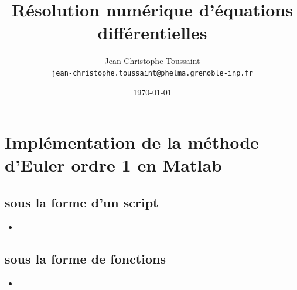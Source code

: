 \documentclass[a4paper, 10pt]{article}
\newcommand{\insertlisting}[2]
  {\begin{itemize}\item[]\end{itemize}}
\begin{document}
\title{Résolution numérique d'équations différentielles}

\author{Jean-Christophe Toussaint\\
 \texttt{jean-christophe.toussaint@phelma.grenoble-inp.fr}}
\date{\today}
 
\maketitle

\section{Implémentation de la méthode d'Euler ordre 1 en Matlab}

\subsection{sous la forme d'un script}
\insertlisting{euler_script.m}{euler\_script}

\subsection{sous la forme de fonctions}
\insertlisting{solver_euler.m}{solver\_euler}
\end{document}

